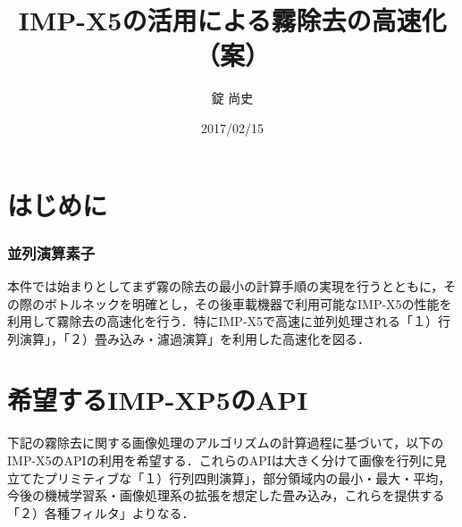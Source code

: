 \documentclass{jsarticle}
\title{IMP-X5の活用による霧除去の高速化（案）}
\author{錠 尚史}
\date{2017/02/15}
\begin{document}
\maketitle



\part{はじめに}
\label{はじめに}


\section{並列演算素子}
\label{並列演算素子}

本件では始まりとしてまず霧の除去の最小の計算手順の実現を行うとともに，その際のボトルネックを明確とし，その後車載機器で利用可能なIMP-X5の性能を利用して霧除去の高速化を行う．特にIMP-X5で高速に並列処理される「１）行列演算」，「２）畳み込み・濾過演算」を利用した高速化を図る．


\part{希望するIMP-XP5のAPI}
\label{希望するIMP-XP5のAPI}

下記の霧除去に関する画像処理のアルゴリズムの計算過程に基づいて，以下のIMP-X5のAPIの利用を希望する．これらのAPIは大きく分けて画像を行列に見立てたプリミティブな「１）行列四則演算」，部分領域内の最小・最大・平均，今後の機械学習系・画像処理系の拡張を想定した畳み込み，これらを提供する「２）各種フィルタ」よりなる．
\end{document}
